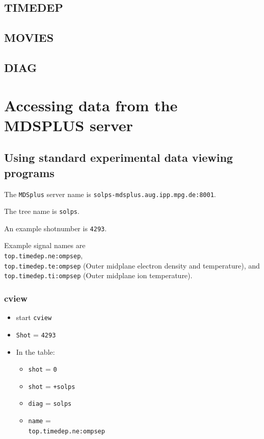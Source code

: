 \documentclass[a4paper,10pt]{report}
\begin{document}

\subsection{TIMEDEP}


\subsection{MOVIES}


\subsection{DIAG}


\section{Accessing data from the MDSPLUS server}

\subsection{Using standard experimental data viewing programs}

The {\tt MDSplus} server name is {\tt solps-mdsplus.aug.ipp.mpg.de:8001}.

The tree name is {\tt solps}.

An example shotnumber is {\tt 4293}.

Example signal names are {\tt \\top.timedep.ne:ompsep},
{\tt \\top.timedep.te:ompsep} (Outer midplane electron density and temperature), and
{\tt \\top.timedep.ti:ompsep} (Outer midplane ion temperature).

\subsubsection{cview}

\begin{itemize}
\item start {\tt cview}
\item {\tt Shot} = {\tt 4293}
\item In the table:
  \begin{itemize}
  \item {\tt shot} = {\tt 0}
  \item {\tt shot} = {\tt +solps}
  \item {\tt diag} = {\tt solps}
  \item {\tt name} = {\tt \\top.timedep.ne:ompsep}
  \end{itemize}
\end{itemize}
\end{document}
